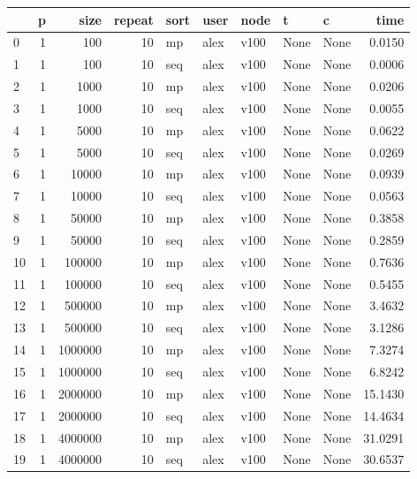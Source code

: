 \begin{tabular}{lrrrlllllr}
\toprule
{} &   p &      size &  repeat & sort &  user &  node &     t &     c &     time \\
\midrule
0   &   1 &       100 &      10 &   mp &  alex &  v100 &  None &  None &   0.0150 \\
1   &   1 &       100 &      10 &  seq &  alex &  v100 &  None &  None &   0.0006 \\
2   &   1 &      1000 &      10 &   mp &  alex &  v100 &  None &  None &   0.0206 \\
3   &   1 &      1000 &      10 &  seq &  alex &  v100 &  None &  None &   0.0055 \\
4   &   1 &      5000 &      10 &   mp &  alex &  v100 &  None &  None &   0.0622 \\
5   &   1 &      5000 &      10 &  seq &  alex &  v100 &  None &  None &   0.0269 \\
6   &   1 &     10000 &      10 &   mp &  alex &  v100 &  None &  None &   0.0939 \\
7   &   1 &     10000 &      10 &  seq &  alex &  v100 &  None &  None &   0.0563 \\
8   &   1 &     50000 &      10 &   mp &  alex &  v100 &  None &  None &   0.3858 \\
9   &   1 &     50000 &      10 &  seq &  alex &  v100 &  None &  None &   0.2859 \\
10  &   1 &    100000 &      10 &   mp &  alex &  v100 &  None &  None &   0.7636 \\
11  &   1 &    100000 &      10 &  seq &  alex &  v100 &  None &  None &   0.5455 \\
12  &   1 &    500000 &      10 &   mp &  alex &  v100 &  None &  None &   3.4632 \\
13  &   1 &    500000 &      10 &  seq &  alex &  v100 &  None &  None &   3.1286 \\
14  &   1 &   1000000 &      10 &   mp &  alex &  v100 &  None &  None &   7.3274 \\
15  &   1 &   1000000 &      10 &  seq &  alex &  v100 &  None &  None &   6.8242 \\
16  &   1 &   2000000 &      10 &   mp &  alex &  v100 &  None &  None &  15.1430 \\
17  &   1 &   2000000 &      10 &  seq &  alex &  v100 &  None &  None &  14.4634 \\
18  &   1 &   4000000 &      10 &   mp &  alex &  v100 &  None &  None &  31.0291 \\
19  &   1 &   4000000 &      10 &  seq &  alex &  v100 &  None &  None &  30.6537 \\

\end{tabular}
